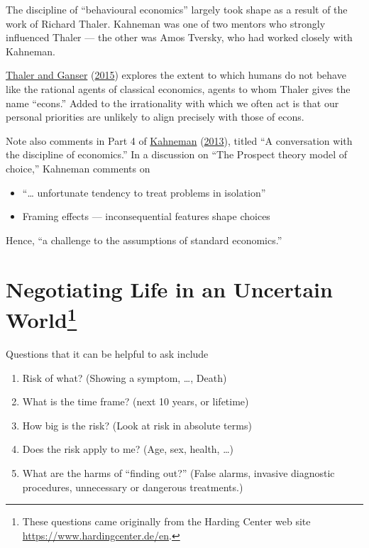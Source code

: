 \documentclass[
  10pt,
  b5paper]{book}
\providecommand{\tightlist}{%
  \setlength{\itemsep}{0pt}\setlength{\parskip}{0pt}}
\begin{document}
The discipline of ``behavioural economics'' largely took shape
as a result of the work of Richard Thaler. Kahneman was
one of two mentors who strongly influenced Thaler --- the
other was Amos Tversky, who had worked closely with Kahneman.

\protect\hyperlink{ref-thaler2015misbehaving}{Thaler and Ganser} (\protect\hyperlink{ref-thaler2015misbehaving}{2015}) explores the extent to which humans do
not behave like the rational agents of classical economics,
agents to whom Thaler gives the name ``econs.'' Added to the
irrationality with which we often act is that our personal
priorities are unlikely to align precisely with those of econs.

Note also comments in Part 4 of \protect\hyperlink{ref-kahneman_2013}{Kahneman} (\protect\hyperlink{ref-kahneman_2013}{2013}), titled
``A conversation with the discipline of economics.''
In a discussion on ``The Prospect theory model of choice,''
Kahneman comments on

\begin{itemize}
\tightlist
\item
  ``\ldots{} unfortunate tendency to treat problems in isolation''
\item
  Framing effects --- inconsequential features shape choices
\end{itemize}

Hence, ``a challenge to the assumptions of standard economics.''

\hypertarget{negotiating-life-in-an-uncertain-world}{%
\section[Negotiating Life in an Uncertain World]{\texorpdfstring{Negotiating Life in an Uncertain World\footnote{These questions came originally from the Harding Center web site \url{https://www.hardingcenter.de/en}.}}{Negotiating Life in an Uncertain World}}\label{negotiating-life-in-an-uncertain-world}}

Questions that it can be helpful to ask include

\begin{enumerate}
\def\labelenumi{\arabic{enumi}.}
\tightlist
\item
  Risk of what? (Showing a symptom, \ldots, Death)
\item
  What is the time frame? (next 10 years, or lifetime)
\item
  How big is the risk? (Look at risk in absolute terms)
\item
  Does the risk apply to me? (Age, sex, health, \ldots)
\item
  What are the harms of ``finding out?'' (False alarms, invasive
  diagnostic procedures, unnecessary or dangerous treatments.)
\end{enumerate}
\end{document}
